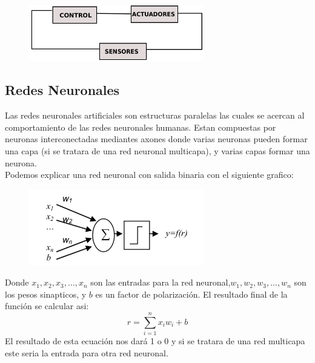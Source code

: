\documentclass[conference]{IEEEtran}
\begin{document}
\begin{figure}
\centering
\includegraphics[width=3.0in]{imagen3.pdf}

\label{fig_mar}
\end{figure}

 \subsection{Redes Neuronales}
 Las redes neuronales artificiales son estructuras paralelas las cuales se acercan al comportamiento de las redes neuronales humanas. Estan compuestas por neuronas  interconectadas mediantes axones donde varias neuronas pueden formar una capa (si se tratara de una red neuronal multicapa), y varias capas formar una neurona.\\
 Podemos explicar una red neuronal con salida binaria con el siguiente grafico:\\
 \begin{figure}
\centering
\includegraphics[width=3.0in]{imagen4.pdf}

\label{fig_mar}
\end{figure}
Donde $x_1,x_2,x_3,...,x_n$ son las entradas para la red neuronal,$w_1,w_2,w_3,...,w_n$  son los pesos sinapticos, y $b$ es un factor de polarizaci\'on. El resultado final de la funci\'on se calcular asi: 
\begin{equation}
r= \sum_{i=1}^{n}x_iw_i+b
\end{equation}
El resultado de esta ecuaci\'on  nos dar\'a 1 o 0 y si se tratara de una red multicapa este seria la entrada para otra red neuronal.\cite{art_red1}
\end{document}
